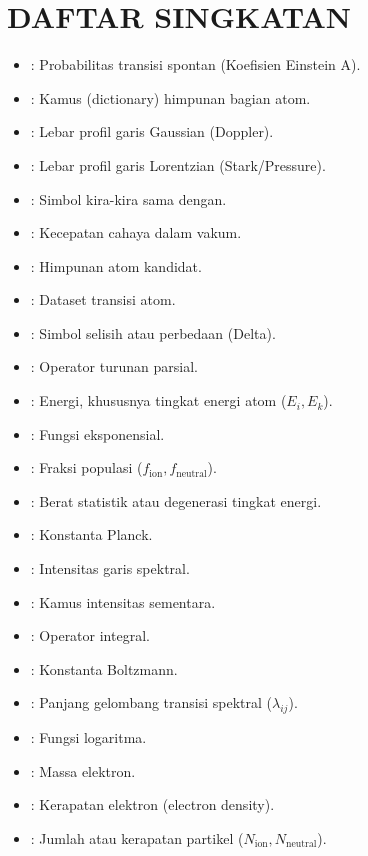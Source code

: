 \chapter*{DAFTAR SINGKATAN}

\begin{itemize}[itemsep=0pt, parsep=0pt]
    \item[$A_{ki}$] : Probabilitas transisi spontan (Koefisien Einstein A).
    \item[$\mathcal{A}$] : Kamus (dictionary) himpunan bagian atom.
    \item[$\alpha_G$] : Lebar profil garis Gaussian (Doppler).
    \item[$\alpha_L$] : Lebar profil garis Lorentzian (Stark/Pressure).
    \item[$\approx$] : Simbol kira-kira sama dengan.
    \item[$c$] : Kecepatan cahaya dalam vakum.
    \item[$\mathcal{C}$] : Himpunan atom kandidat.
    \item[$\mathcal{D}$] : Dataset transisi atom.
    \item[$\Delta$] : Simbol selisih atau perbedaan (Delta).
    \item[$\partial$] : Operator turunan parsial.
    \item[$E$] : Energi, khususnya tingkat energi atom ($E_i, E_k$).
    \item[$\exp()$] : Fungsi eksponensial.
    \item[$f$] : Fraksi populasi ($f_{\text{ion}}, f_{\text{neutral}}$).
    \item[$g$] : Berat statistik atau degenerasi tingkat energi.
    \item[$h$] : Konstanta Planck.
    \item[$I$] : Intensitas garis spektral.
    \item[$\mathcal{I}$] : Kamus intensitas sementara.
    \item[$\int$] : Operator integral.
    \item[$k_B$] : Konstanta Boltzmann.
    \item[$\lambda$] : Panjang gelombang transisi spektral ($\lambda_{ij}$).
    \item[$\log()$] : Fungsi logaritma.
    \item[$m_e$] : Massa elektron.
    \item[$n_e$] : Kerapatan elektron (electron density).
    \item[$N$] : Jumlah atau kerapatan partikel ($N_{\text{ion}}, N_{\text{neutral}}$).

\end{itemize}
